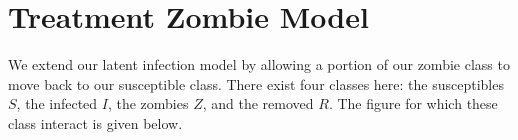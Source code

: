 \documentclass[]{article}
\begin{document}
\section{Treatment Zombie Model}
We extend our latent infection model by allowing a portion of our zombie class to
move back to our susceptible class. There exist four classes here: the susceptibles $S$, the
infected $I$, the zombies $Z$, and the removed $R$. The figure for which these class interact
is given below.
\begin{figure}[H]
\end{figure}
\end{document}
